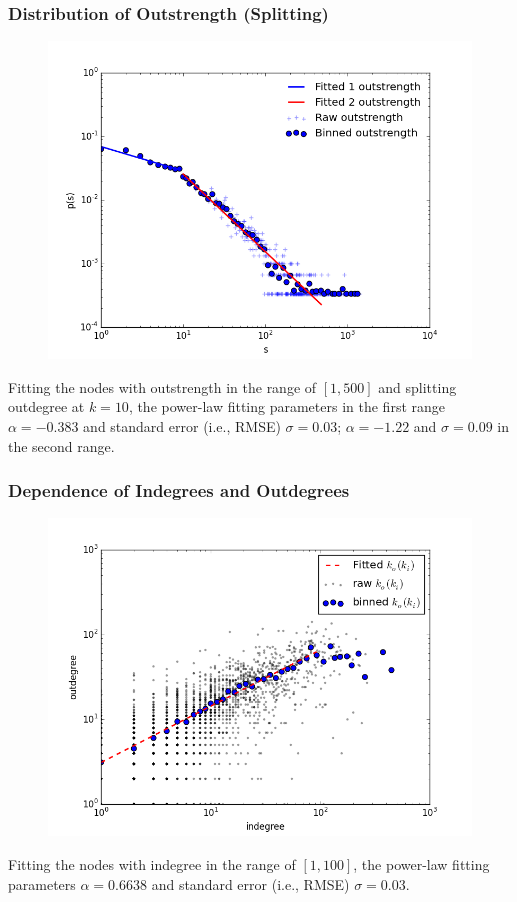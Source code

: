 \documentclass{beamer}
\begin{document}
\begin{frame}
\frametitle{Distribution of Outstrength (Splitting)}
\begin{figure}
\includegraphics[width=0.8\linewidth]{figs/outstrength_split.png}
\end{figure}
\small{Fitting the nodes with outstrength in the range of $[1,500]$ and splitting outdegree at $k=10$, the power-law fitting parameters in the first range $\alpha=-0.383$ and standard error (i.e., RMSE) $\sigma= 0.03$; $\alpha=-1.22$ and $\sigma= 0.09$ in the second range.}
\end{frame}


\begin{frame}
\frametitle{Dependence of Indegrees and Outdegrees}
\begin{figure}
\includegraphics[width=0.8\linewidth]{figs/out_in_degree.png}
\end{figure}
\small{Fitting the nodes with indegree in the range of $[1, 100]$, the power-law fitting parameters $\alpha=0.6638$ and standard error (i.e., RMSE) $\sigma= 0.03$.}
\end{frame}
\end{document}
